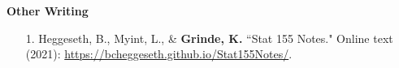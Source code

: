 \documentclass[margin]{res}
\newenvironment{benumerate}[1]{
    \let\oldItem\item
    \def\item{\addtocounter{enumi}{-2}\oldItem}
    
    \begin{enumerate}
    \setcounter{enumi}{#1}
    \addtocounter{enumi}{1}
}{
    \end{enumerate}
}
\begin{document}
\begin{resume}
\begin{benumerate}{1}
\end{benumerate}



\textbf{Other Writing}

\begin{itemize}

\item[1.] Heggeseth, B., Myint, L., \& \textbf{Grinde, K.} ``Stat 155 Notes." Online text (2021): \href{https://bcheggeseth.github.io/Stat155Notes/}{https://bcheggeseth.github.io/Stat155Notes/}. \\

\end{itemize}



\end{resume}
\end{document}
